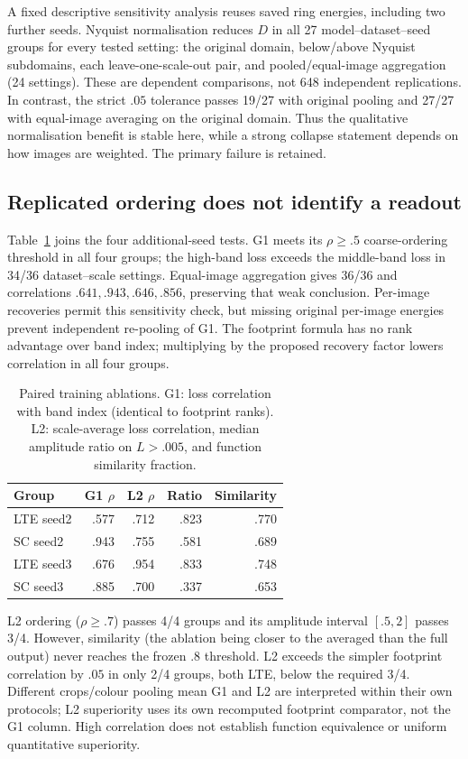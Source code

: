 A fixed descriptive sensitivity analysis reuses saved ring energies,
including two further seeds. Nyquist normalisation reduces $D$ in all
27 model--dataset--seed groups for every tested setting: the original
domain, below/above Nyquist subdomains, each leave-one-scale-out pair,
and pooled/equal-image aggregation (24 settings). These are dependent
comparisons, not 648 independent replications. In contrast, the strict
$.05$ tolerance passes 19/27 with original pooling and 27/27 with
equal-image averaging on the original domain. Thus the qualitative
normalisation benefit is stable here, while a strong collapse statement
depends on how images are weighted. The primary failure is retained.

\subsection{Replicated ordering does not identify a readout}
Table~\ref{tab:readout} joins the four additional-seed tests. G1 meets
its $\rho\ge.5$ coarse-ordering threshold in all four groups; the high-band loss
exceeds the middle-band loss in 34/36 dataset--scale settings.
Equal-image aggregation gives 36/36 and correlations
$.641,.943,.646,.856$, preserving that weak conclusion. Per-image
recoveries permit this sensitivity check, but missing original per-image
energies prevent independent re-pooling of G1. The footprint formula
has no rank advantage over band index; multiplying by the proposed
recovery factor lowers correlation in all four groups.

\begin{table}[t]\centering
\caption{Paired training ablations. G1: loss correlation with band index
(identical to footprint ranks). L2: scale-average loss correlation,
median amplitude ratio on $L>.005$, and function similarity fraction.}
\label{tab:readout}
\begin{tabular}{lrrrr}\toprule
Group & G1 $\rho$ & L2 $\rho$ & Ratio & Similarity\\\midrule
LTE seed2 & .577 & .712 & .823 & .770\\
SC seed2 & .943 & .755 & .581 & .689\\
LTE seed3 & .676 & .954 & .833 & .748\\
SC seed3 & .885 & .700 & .337 & .653\\\bottomrule
\end{tabular}
\end{table}

L2 ordering ($\rho\ge.7$) passes 4/4 groups and its amplitude interval $[.5,2]$
passes 3/4. However, similarity (the ablation being closer to the averaged
than the full output) never reaches the frozen $.8$ threshold. L2 exceeds
the simpler footprint correlation by $.05$ in only 2/4 groups, both LTE,
below the required 3/4. Different crops/colour pooling mean G1 and L2
are interpreted within their own protocols; L2 superiority uses its
own recomputed footprint comparator, not the G1 column. High correlation does not
establish function equivalence or uniform quantitative superiority.

